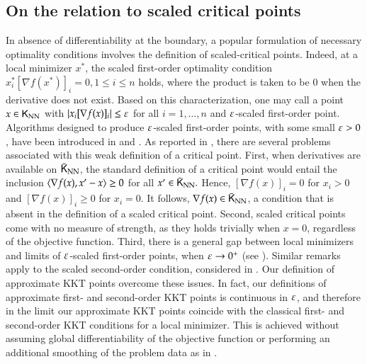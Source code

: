 \subsection{On the relation to scaled critical points}
In absence of differentiability at the boundary, a popular formulation of necessary optimality conditions involves the definition of scaled-critical points. Indeed, at a local minimizer $x^{\ast}$, the scaled first-order optimality condition $x_{i}^{\ast}[\nabla f(x^{\ast})]_{i}=0,1\leq i\leq n$ holds, where the product is taken to be $0$ when the derivative does not exist. Based on this characterization, one may call a point $x\in\mathsf{K}_{\text{NN}}$ with $\lvert x_{i}[\nabla f(x)]_{i}\rvert\leq\varepsilon$ for all $i=1,\ldots,n$ and $\varepsilon$-scaled first-order point. Algorithms designed to produce $\varepsilon$-scaled first-order points, with some small $\varepsilon>0$, have been introduced in \cite{BiaCheYe15} and \cite{BiaChe15}. As reported in \cite{HaeLiuYe18}, there are several problems associated with this weak definition of a critical point. First, when derivatives are available on $\bar{\mathsf{K}}_{\text{NN}}$, the standard definition of a critical point would entail the inclusion $\langle\nabla f(x),x'-x\rangle\geq 0$ for all $x'\in \bar{\mathsf{K}}_{\text{NN}}.$ Hence, $[\nabla f(x)]_{i}=0$ for $x_{i}>0$ and $[\nabla f(x)]_{i}\geq 0$ for $x_{i}=0$. It follows, $\nabla f(x)\in\bar{\mathsf{K}}_{\text{NN}}$, a condition that is absent in the definition of a scaled critical point. Second, scaled critical points come with no measure of strength, as they holds trivially when $x=0$, regardless of the objective function. Third, there is a general gap between local minimizers and limits of $\varepsilon$-scaled first-order points, when $\varepsilon\to 0^{+}$ (see \cite{HaeLiuYe18}). Similar remarks apply to the scaled second-order condition, considered in \cite{BiaChe15}. Our definition of approximate KKT points overcome these issues. In fact, our definitions of approximate first- and second-order KKT points is continuous in $\varepsilon$, and therefore in the limit our approximate KKT points coincide with the classical first- and second-order KKT conditions for a local minimizer. This is achieved without assuming global differentiability of the objective function or performing an additional smoothing of the problem data as in \cite{Bian:2013vd,BiaChe15}. 




